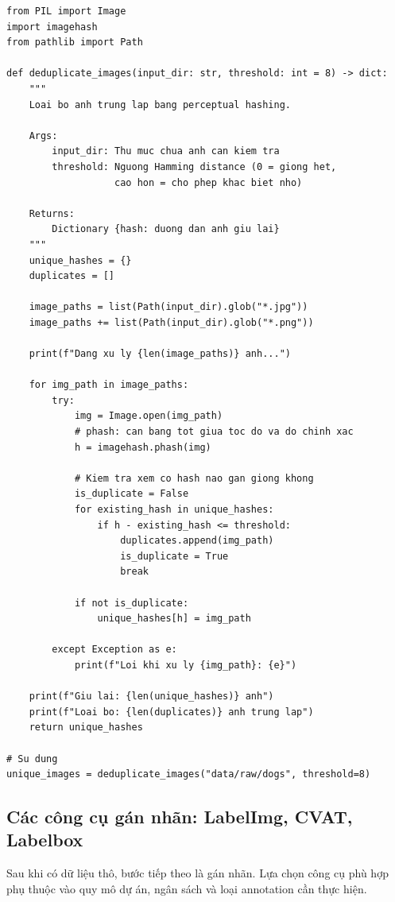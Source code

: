\begin{verbatim}
from PIL import Image
import imagehash
from pathlib import Path

def deduplicate_images(input_dir: str, threshold: int = 8) -> dict:
    """
    Loai bo anh trung lap bang perceptual hashing.

    Args:
        input_dir: Thu muc chua anh can kiem tra
        threshold: Nguong Hamming distance (0 = giong het,
                   cao hon = cho phep khac biet nho)

    Returns:
        Dictionary {hash: duong dan anh giu lai}
    """
    unique_hashes = {}
    duplicates = []

    image_paths = list(Path(input_dir).glob("*.jpg"))
    image_paths += list(Path(input_dir).glob("*.png"))

    print(f"Dang xu ly {len(image_paths)} anh...")

    for img_path in image_paths:
        try:
            img = Image.open(img_path)
            # phash: can bang tot giua toc do va do chinh xac
            h = imagehash.phash(img)

            # Kiem tra xem co hash nao gan giong khong
            is_duplicate = False
            for existing_hash in unique_hashes:
                if h - existing_hash <= threshold:
                    duplicates.append(img_path)
                    is_duplicate = True
                    break

            if not is_duplicate:
                unique_hashes[h] = img_path

        except Exception as e:
            print(f"Loi khi xu ly {img_path}: {e}")

    print(f"Giu lai: {len(unique_hashes)} anh")
    print(f"Loai bo: {len(duplicates)} anh trung lap")
    return unique_hashes

# Su dung
unique_images = deduplicate_images("data/raw/dogs", threshold=8)
\end{verbatim}

\subsection{Các công cụ gán nhãn: LabelImg, CVAT, Labelbox}
\label{subsec:labeling_tools}

Sau khi có dữ liệu thô, bước tiếp theo là gán nhãn. Lựa chọn công cụ phù hợp phụ thuộc vào quy mô dự án, ngân sách và loại annotation cần thực hiện.

